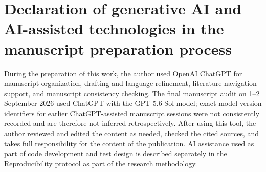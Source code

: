 \documentclass[5p,times]{elsarticle}
\begin{document}
\section*{Declaration of generative AI and AI-assisted technologies in the manuscript preparation process}
During the preparation of this work, the author used OpenAI ChatGPT for manuscript organization, drafting and language refinement, literature-navigation support, and manuscript consistency checking. The final manuscript audit on 1--2 September 2026 used ChatGPT with the GPT-5.6 Sol model; exact model-version identifiers for earlier ChatGPT-assisted manuscript sessions were not consistently recorded and are therefore not inferred retrospectively. After using this tool, the author reviewed and edited the content as needed, checked the cited sources, and takes full responsibility for the content of the publication. AI assistance used as part of code development and test design is described separately in the Reproducibility protocol as part of the research methodology.



\end{document}
